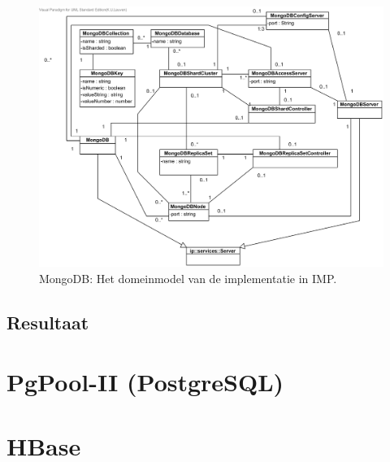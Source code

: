 \begin{figure}[!htb]
	    \centering
    \includegraphics[width=\textwidth]{img/MongoDB-Domain.png}
    \caption{MongoDB: Het domeinmodel van de implementatie in IMP.}
    \label{fig:mongodb-imp-domein}
\end{figure}

\subsection{Resultaat}

\section{PgPool-II (PostgreSQL)}

\section{HBase}